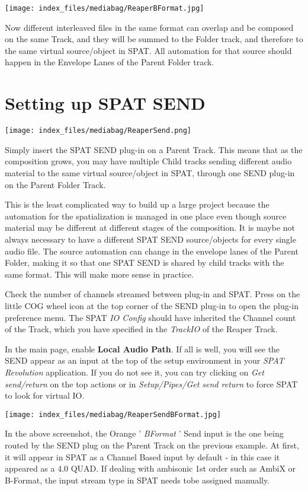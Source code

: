 \documentclass[
  letterpaper,
  DIV=11,
  numbers=noendperiod]{scrreport}
\begin{document}
\texttt{[image: index\_files/mediabag/ReaperBFormat.jpg]}

Now different interleaved files in the same format can overlap and be
composed on the same Track, and they will be summed to the Folder track,
and therefore to the same virtual source/object in SPAT. All automation
for that source should happen in the Envelope Lanes of the Parent Folder
track.

\hypertarget{setting-up-spat-send}{%
\section{Setting up SPAT SEND}\label{setting-up-spat-send}}

\texttt{[image: index\_files/mediabag/ReaperSend.png]}

Simply insert the SPAT SEND plug-in on a Parent Track. This means that
as the composition grows, you may have multiple Child tracks sending
different audio material to the same virtual source/object in SPAT,
through one SEND plug-in on the Parent Folder Track.

This is the least complicated way to build up a large project because
the automation for the spatialization is managed in one place even
though source material may be different at different stages of the
composition. It is maybe not always necessary to have a different SPAT
SEND source/objects for every single audio file. The source automation
can change in the envelope lanes of the Parent Folder, making it so that
one SPAT SEND is shared by child tracks with the same format. This will
make more sense in practice.

Check the number of channels streamed between plug-in and SPAT. Press on
the little COG wheel icon at the top corner of the SEND plug-in to open
the plug-in preference menu. The SPAT \emph{IO Config} should have
inherited the Channel count of the Track, which you have specified in
the \emph{TrackIO} of the Reaper Track.

In the main page, enable \textbf{Local Audio Path}. If all is well, you
will see the SEND appear as an input at the top of the setup environment
in your \emph{SPAT Revolution} application. If you do not see it, you
can try clicking on \emph{Get send/return} on the top actions or in
\emph{Setup/Pipes/Get send return} to force SPAT to look for virtual IO.

\texttt{[image: index\_files/mediabag/ReaperSendBFormat.jpg]}

In the above screenshot, the Orange ' \emph{BFormat} ' Send input is the
one being routed by the SEND plug on the Parent Track on the previous
example. At first, it will appear in SPAT as a Channel Based input by
default - in this case it appeared as a 4.0 QUAD. If dealing with
ambisonic 1st order such as AmbiX or B-Format, the input stream type in
SPAT needs tobe assigned manually.
\end{document}
